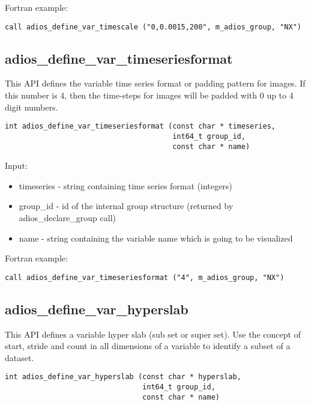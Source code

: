 Fortran example:
\begin{lstlisting}[alsolanguage=Fortran,caption={},label={}]
call adios_define_var_timescale ("0,0.0015,200", m_adios_group, "NX")
\end{lstlisting}
                             

\subsection{adios\_define\_var\_timeseriesformat}
This API defines the variable time series format or padding pattern for images.
If this number is 4, then the time-steps for images will be padded with 0 up to 4 digit numbers.

\begin{lstlisting}[alsolanguage=C,caption={},label={}]
int adios_define_var_timeseriesformat (const char * timeseries, 
                                       int64_t group_id, 
                                       const char * name)
\end{lstlisting}

Input:
\begin{itemize}
\item timeseries - string containing time series format (integers)
\item group\_id - id of the internal group structure (returned by adios\_declare\_group call)
\item name - string containing the variable name which is going to be visualized
\end{itemize}

Fortran example:
\begin{lstlisting}[alsolanguage=Fortran,caption={},label={}]
call adios_define_var_timeseriesformat ("4", m_adios_group, "NX")
\end{lstlisting}


\subsection{adios\_define\_var\_hyperslab}
This API defines a variable hyper slab (sub set or super set). Use the concept of start, stride
and count in all dimensions of a variable to identify a subset of a dataset.

\begin{lstlisting}[alsolanguage=C,caption={},label={}]
int adios_define_var_hyperslab (const char * hyperslab, 
                                int64_t group_id, 
                                const char * name)
\end{lstlisting}

